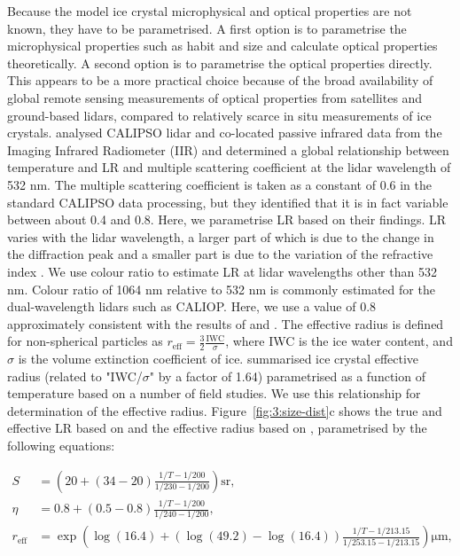 Because the model ice crystal microphysical and optical properties are not known,
they have to be parametrised. A first option is to parametrise the microphysical
properties such as habit and size and calculate optical properties theoretically.
A second option is to parametrise the optical properties directly. This
appears to be a more practical choice because of the broad availability of global remote sensing
measurements of optical properties from satellites and ground-based lidars,
compared to relatively scarce in situ measurements of ice crystals.
\cite{garnier2015} analysed CALIPSO lidar and co-located passive infrared data
from the Imaging Infrared Radiometer (IIR)
and determined a global relationship between temperature and LR and
multiple scattering coefficient at the lidar wavelength of 532 nm. The multiple
scattering coefficient is taken as a constant of 0.6 in the standard CALIPSO data processing,
but they identified that it is in fact variable between about 0.4 and 0.8.
Here, we parametrise LR based on their findings. LR
varies with the lidar wavelength, a larger part of which is due to the
change in the diffraction peak and a smaller part is due to the variation of
the refractive index \citep{borovoi2014}. We use colour ratio to estimate
LR at lidar wavelengths other than 532 nm. Colour ratio
of 1064 nm relative to 532 nm is commonly estimated for the dual-wavelength
lidars such as CALIOP. Here, we use a value of 0.8 approximately consistent
with the results of \cite{bi2009} and \cite{vaughan2010}.
The effective radius is defined for non-spherical particles as
$r_\text{eff} = \frac{3}{2}\frac{\mathrm{IWC}}{\sigma}$, where IWC is the ice
water content, and $\sigma$ is the volume extinction coefficient of ice.
\cite{heymsfield2005} summarised ice crystal effective radius
(related to "IWC/$\sigma$" by a factor of 1.64) parametrised
as a function of temperature based on a number of field studies. We use this
relationship for determination of the effective radius.
Figure~\ref{fig:3:size-dist}c shows the true and effective LR based on \cite{garnier2015}
and the effective radius based on \cite{heymsfield2005}, parametrised by
the following equations:

\begin{align*}
S &= \left(20 + (34 - 20)\frac{1/T - 1/200}{1/230 - 1/200}\right) \mathrm{sr},\\
\eta &= 0.8 + (0.5 - 0.8)\frac{1/T - 1/200}{1/240 - 1/200},\\
r_\text{eff} &= \exp\left(\log(16.4) + (\log(49.2) - \log(16.4))\frac{1/T - 1/213.15}{1/253.15 - 1/213.15}\right) \mathrm{\mu m},
\end{align*}

